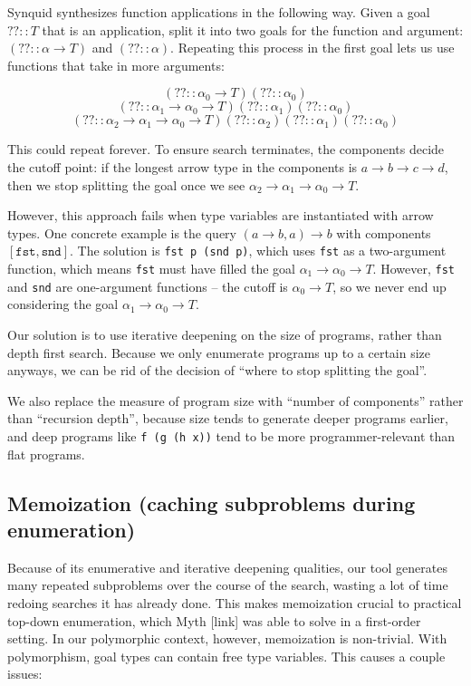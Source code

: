 \documentclass[acmsmall,nonacm]{acmart}
\begin{document}
Synquid synthesizes function applications in the following way. 
Given a goal $?? :: T$ that is an application, split it into two 
goals for the function and argument: $(?? :: \alpha \to T)$ and 
$(?? :: \alpha)$. Repeating this process in the first goal lets us 
use functions that take in more arguments:

\[ (?? :: \alpha_0 \to T) (?? :: \alpha_0) \]
\[ (?? :: \alpha_1 \to \alpha_0 \to T) (?? :: \alpha_1) (?? :: \alpha_0) \]
\[ (?? :: \alpha_2 \to \alpha_1 \to \alpha_0 \to T) (?? :: \alpha_2) (?? :: \alpha_1) (?? :: \alpha_0) \]

This could repeat forever. To ensure search terminates, the components 
decide the cutoff point: if the longest arrow type in the components is 
$a \to b \to c \to d$, then we stop splitting the goal once we see 
$\alpha_2 \to \alpha_1 \to \alpha_0 \to T$.

However, this approach fails when type variables are instantiated with 
arrow types. One concrete example is the query $(a \to b, a) \to b$ 
with components $[\texttt{fst}, \texttt{snd}]$. The solution is 
\texttt{fst p (snd p)}, which uses \texttt{fst} as a two-argument function, 
which means \texttt{fst} must have filled the goal $\alpha_1 \to \alpha_0 \to T$. 
However, \texttt{fst} and \texttt{snd} are one-argument functions -- 
the cutoff is $\alpha_0 \to T$, so we never end up considering the goal 
$\alpha_1 \to \alpha_0 \to T$.

Our solution is to use iterative deepening on the size of programs, 
rather than depth first search. Because we only enumerate programs up 
to a certain size anyways, we can be rid of the decision of ``where to 
stop splitting the goal''.

We also replace the measure of program size with ``number of components'' 
rather than ``recursion depth'', because size tends to generate deeper 
programs earlier, and deep programs like \texttt{f (g (h x))} tend to 
be more programmer-relevant than flat programs.



\subsection{Memoization (caching subproblems during enumeration)}

Because of its enumerative and iterative deepening qualities, our tool 
generates many repeated subproblems
over the course of the search, wasting a lot of time redoing searches it has
already done. This makes memoization crucial to practical 
top-down enumeration, which Myth [link] was able to solve in a 
first-order setting.
In our polymorphic context, however, memoization is non-trivial. 
With polymorphism, goal types can contain free 
type variables. This causes a couple issues:
\end{document}
